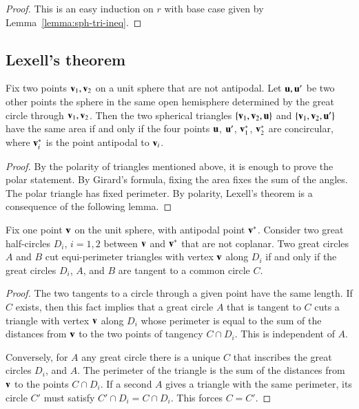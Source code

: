 \begin{proof} This is an easy induction on $r$ with base
case given by Lemma~\ref{lemma:sph-tri-ineq}.
\end{proof}

\subsection{Lexell's theorem}

\begin{lemma}[Lexell]
Fix two points ${\mathbf v}_1,{\mathbf v}_2$ on a unit sphere  that
are not antipodal.
Let ${\mathbf u},{\mathbf u}'$ be two other points the sphere in the same open hemisphere determined by the great circle through ${\mathbf v}_1,{\mathbf v}_2$.  Then the two spherical triangles $\{{\mathbf v}_1,{\mathbf v}_2,{\mathbf u}\}$ and $\{{\mathbf v}_1,{\mathbf v}_2,{\mathbf u}'\}$ have the same area if and only if
the four points ${\mathbf u}$, ${\mathbf u}'$, ${\mathbf v}^*_1$, ${\mathbf v}^*_2$ are concircular, where ${\mathbf v}^*_i$ is the point antipodal to ${\mathbf v}_i$.
\end{lemma}
%
%



\begin{proof}  By the polarity of triangles mentioned above, it is enough to prove the polar statement.  By Girard's formula, fixing the area fixes the sum of the angles.  The polar triangle has fixed perimeter.  By polarity, Lexell's theorem is a consequence of the following lemma.
\end{proof}
%

\begin{lemma}  Fix one point ${\mathbf v}$ on the unit sphere, with antipodal point ${\mathbf v}^*$.  Consider two great half-circles $D_i$, $i=1,2$ between ${\mathbf v}$ and ${\mathbf v}^*$ that are not coplanar.  Two great circles $A$ and $B$ cut equi-perimeter triangles with vertex ${\mathbf v}$ along $D_i$ if and only if the great circles $D_i$, $A$, and $B$ are tangent to a common circle $C$.
\end{lemma}
%

\begin{proof} The two tangents to a circle through a given point have the same length.  If $C$ exists, then this fact implies that a great circle $A$ that is tangent to $C$ cuts a triangle with vertex ${\mathbf v}$ along $D_i$ whose perimeter is equal to the sum of the distances from ${\mathbf v}$ to the two points of tangency $C\cap D_i$.  This is independent of $A$.
%
%
%

Conversely, for $A$ any great circle there is a unique $C$ that inscribes the great circles $D_i$, and $A$.  The perimeter of the triangle is the sum of the distances from ${\mathbf v}$ to the points $C\cap D_i$.
If a second $A$ gives a triangle with the same perimeter, its circle $C'$
must satisfy $C'\cap D_i = C\cap D_i$.  This forces $C=C'$.
\end{proof}


